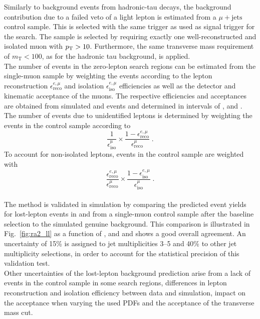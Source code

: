 Similarly to background events from hadronic-tau decays, the background contribution due to a failed veto of a light lepton is estimated from a $\mu + \mathrm{jets}$ control sample. This is selected with the same trigger as used as signal trigger for the search. The sample is selected by requiring exactly one well-reconstructed and isolated muon with $p_{\text{T}} > 10$\gev. Furthermore, the same transverse mass requirement of $m_\mathrm{T} < 100$\gev, as for the hadronic tau background, is applied. \\
The number of events in the zero-lepton search regions can be estimated from the single-muon sample by weighting the events according to the lepton reconstruction $\epsilon_\mathrm{reco}^{e, \mu}$ and isolation $\epsilon_\mathrm{iso}^{e, \mu}$ efficiencies as well as the detector and kinematic acceptance of the muons. The respective efficiencies and acceptances are obtained from simulated \ttbar and \WJets events and determined in intervals of \HT, \MHT and \NJets. \\
The number of events due to unidentified leptons is determined by weighting the events in the control sample according to
\begin{equation*}
\frac{1}{\epsilon_\mathrm{iso}^\mathrm{\mu}} \times \frac{1-\epsilon_\mathrm{reco}^{e, \mu}}{\epsilon_\mathrm{reco}^{\mu}} \; .
\end{equation*}
To account for non-isolated leptons, events in the control sample are weighted with
\begin{equation*}
\frac{\epsilon_\mathrm{reco}^{e, \mu}}{\epsilon_\mathrm{reco}^{\mu}} \times \frac{1-\epsilon_\mathrm{iso}^{e, \mu}}{\epsilon_\mathrm{iso}^{\mu}} \; .
\end{equation*}
\\
The method is validated in simulation by comparing the predicted event yields for lost-lepton events in \ttbar and \WJets from a single-muon control sample after the baseline selection to the simulated genuine background. This comparison is illustrated in Fig.~\ref{fig:ra2_ll} as a function of \HT, \MHT and \NJets and shows a good overall agreement. An uncertainty of 15\% is assigned to jet multiplicities 3--5 and 40\% to other jet multiplicity selections, in order to account for the statistical precision of this validation test.\\
Other uncertainties of the lost-lepton background prediction arise from a lack of events in the control sample in some search regions, differences in lepton reconstruction and isolation efficiency between data and simulation, impact on the acceptance when varying the used PDFs and the acceptance of the transverse mass cut.

